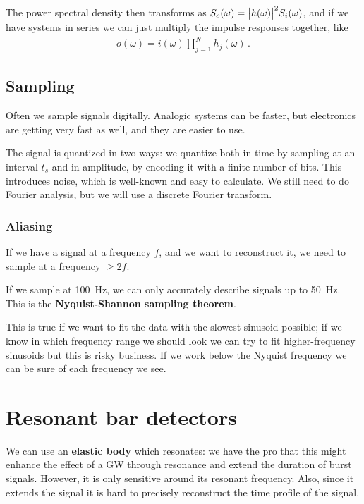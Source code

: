 \documentclass[main.tex]{subfiles}
\begin{document}
The power spectral density then transforms as \(S_o (\omega ) = \abs{h(\omega )}^2 S_i (\omega )\), and if we have systems in series we can just multiply the impulse responses together, like 
%
\begin{align}
o (\omega ) = i(\omega )\prod_{j = 1}^{N} h_j (\omega ) 
\,.
\end{align}

\subsection{Sampling}

Often we sample signals digitally.
Analogic systems can be faster, but electronics are getting very fast as well, and they are easier to use.

The signal is quantized in two ways: we quantize both in time by sampling at an interval \(t_s\) and in amplitude, by encoding it with a finite number of bits.
This introduces noise, which is well-known and easy to calculate.
We still need to do Fourier analysis, but we will use a discrete Fourier transform.

\subsubsection{Aliasing}

If we have a signal at a frequency \(f\), and we want to reconstruct it, we need to sample at a frequency \(\geq 2f\).

If we sample at \SI{100}{Hz}, we can only accurately describe signals up to \SI{50}{Hz}. 
This is the \textbf{Nyquist-Shannon sampling theorem}.

This is true if we want to fit the data with the slowest sinusoid possible; if we know in which frequency range we should look we can try to fit higher-frequency sinusoids but this is risky business.
If we work below the Nyquist frequency we can be sure of each frequency we see.

\section{Resonant bar detectors}

We can use an \textbf{elastic body} which resonates: we have the pro that this might enhance the effect of a GW through resonance and extend the duration of burst signals. 
However, it is only sensitive around its resonant frequency. 
Also, since it extends the signal it is hard to precisely reconstruct the time profile of the signal. 
\end{document}
